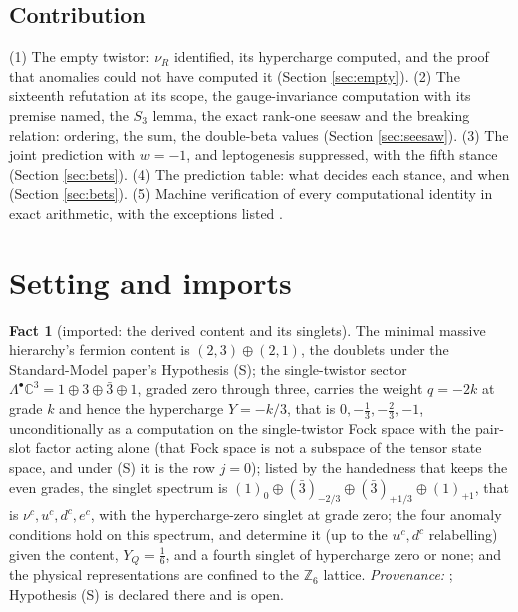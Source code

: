 \documentclass[11pt]{article}
\theoremstyle{definition}
\newtheorem{fact}[theorem]{Fact}
\newcommand{\C}{\mathbb{C}}
\begin{document}
\subsection*{Contribution}

(1) The empty twistor: $\nu_{R}$ identified, its hypercharge computed, and the proof that anomalies could not have computed it (Section \ref{sec:empty}). (2) The sixteenth refutation at its scope, the gauge-invariance computation with its premise named, the $S_{3}$ lemma, the exact rank-one seesaw and the breaking relation: ordering, the sum, the double-beta values (Section \ref{sec:seesaw}). (3) The joint prediction with $w = -1$, and leptogenesis suppressed, with the fifth stance (Section \ref{sec:bets}). (4) The prediction table: what decides each stance, and when (Section \ref{sec:bets}). (5) Machine verification of every computational identity in exact arithmetic, with the exceptions listed \cite{ButlerVerifyT15}.

\section{Setting and imports}\label{sec:setting}

\begin{fact}[imported: the derived content and its singlets]\label{fact:content}
The minimal massive hierarchy's fermion content is $(2,3) \oplus (2,1)$, the doublets under the Standard-Model paper's Hypothesis (S); the single-twistor sector $\Lambda^{\bullet}\C^{3} = 1 \oplus 3 \oplus \bar{3} \oplus 1$, graded zero through three, carries the weight $q = -2k$ at grade $k$ and hence the hypercharge $Y = -k/3$, that is $0, -\tfrac13, -\tfrac23, -1$, unconditionally as a computation on the single-twistor Fock space with the pair-slot factor acting alone (that Fock space is not a subspace of the tensor state space, and under (S) it is the row $j = 0$); listed by the handedness that keeps the even grades, the singlet spectrum is $(1)_{0} \oplus (\bar{3})_{-2/3} \oplus (\bar{3})_{+1/3} \oplus (1)_{+1}$, that is $\nu^{c}, u^{c}, d^{c}, e^{c}$, with the hypercharge-zero singlet at grade zero; the four anomaly conditions hold on this spectrum, and determine it (up to the $u^{c}, d^{c}$ relabelling) given the content, $Y_{Q} = \tfrac16$, and a fourth singlet of hypercharge zero or none; and the physical representations are confined to the $\mathbb{Z}_{6}$ lattice. \emph{Provenance:} \cite[Prop.~5.1, Prop.~5.3, Thm.~5.5, Thm.~4.2]{ButlerT12}; Hypothesis (S) is declared there and is open.
\end{fact}
\end{document}
